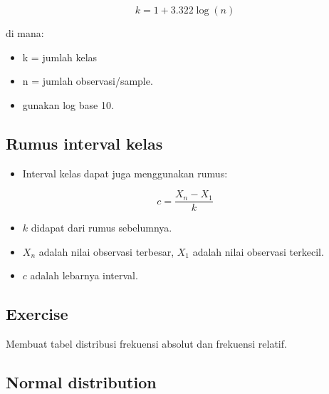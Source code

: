 \documentclass[
  letterpaper,
  DIV=11,
  numbers=noendperiod]{scrartcl}
\providecommand{\tightlist}{%
  \setlength{\itemsep}{0pt}\setlength{\parskip}{0pt}}\usepackage{longtable,booktabs,array}
\begin{document}
\[k=1+3.322\log(n)\]

di mana:

\begin{itemize}
\tightlist
\item
  k = jumlah kelas
\item
  n = jumlah observasi/sample.
\item
  gunakan log base 10.
\end{itemize}

\subsection{Rumus interval kelas}\label{rumus-interval-kelas}

\begin{itemize}
\tightlist
\item
  Interval kelas dapat juga menggunakan rumus:
\end{itemize}

\[c=\frac{X_n-X_1}{k}\]

\begin{itemize}
\item
  \(k\) didapat dari rumus sebelumnya.
\item
  \(X_n\) adalah nilai observasi terbesar, \(X_1\) adalah nilai
  observasi terkecil.
\item
  \(c\) adalah lebarnya interval.
\end{itemize}

\subsection{Exercise}\label{exercise}

Membuat tabel distribusi frekuensi absolut dan frekuensi relatif.

\subsection{Normal distribution}\label{normal-distribution}
\end{document}
